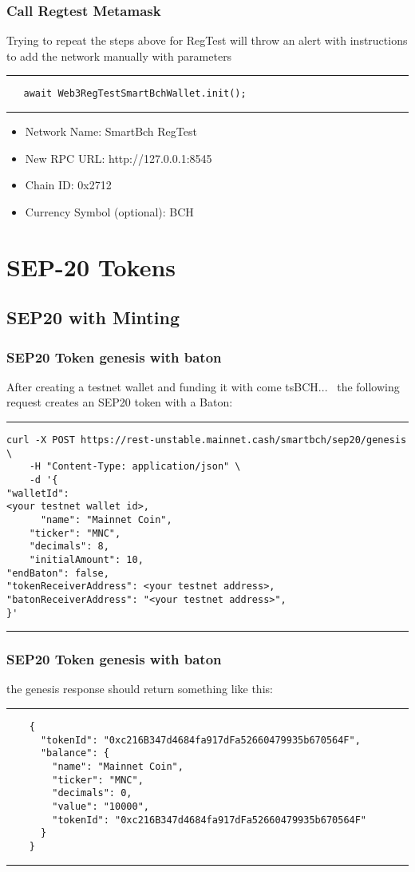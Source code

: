\documentclass{beamer}
\begin{document}
  \begin{frame}[fragile]
    \frametitle{Call Regtest Metamask}
    Trying to repeat the steps above for RegTest will throw an alert with instructions to add 
    the network manually with parameters
    \rule{\textwidth}{0.9pt}
    \tiny
    \begin{verbatim}
   await Web3RegTestSmartBchWallet.init();
    \end{verbatim}
\rule{\textwidth}{0.9pt}
\begin{itemize}
\item  Network Name: SmartBch RegTest
\item  New RPC URL: http://127.0.0.1:8545
\item  Chain ID: 0x2712
\item  Currency Symbol (optional): BCH
\end{itemize}
\end{frame}

\section{SEP-20 Tokens}


\subsection[SEP20 with Minting]{SEP20 with Minting}

\begin{frame}[fragile]
    \frametitle{SEP20 Token genesis with baton}
    After creating a testnet wallet and funding it with come tsBCH... \ 
    the following request creates an SEP20 token with a Baton:
    \rule{\textwidth}{0.9pt}
    \tiny
    \begin{verbatim}
curl -X POST https://rest-unstable.mainnet.cash/smartbch/sep20/genesis \
    -H "Content-Type: application/json" \
    -d '{
"walletId":
<your testnet wallet id>,
      "name": "Mainnet Coin",
    "ticker": "MNC",
    "decimals": 8,
    "initialAmount": 10,
"endBaton": false,
"tokenReceiverAddress": <your testnet address>,
"batonReceiverAddress": "<your testnet address>",
}'
    \end{verbatim}
\rule{\textwidth}{0.9pt}
\end{frame}


\begin{frame}[fragile]
  \frametitle{SEP20 Token genesis with baton}
  the genesis response should return something like this:
  \rule{\textwidth}{0.9pt}
  \tiny
  \begin{verbatim}
    {
      "tokenId": "0xc216B347d4684fa917dFa52660479935b670564F",
      "balance": {
        "name": "Mainnet Coin",
        "ticker": "MNC",
        "decimals": 0,
        "value": "10000",
        "tokenId": "0xc216B347d4684fa917dFa52660479935b670564F"
      }
    }
  \end{verbatim}
\rule{\textwidth}{0.9pt}
\end{frame}
\end{document}
